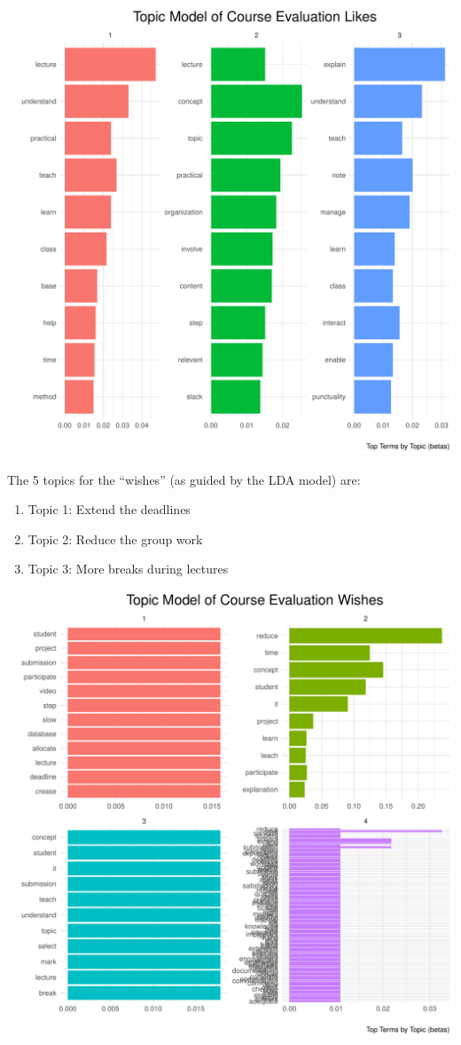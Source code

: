 \documentclass[
]{article}
\begin{document}
\includegraphics{Mid-SemesterCourseEvaluation-20240819-20241125-ADB-BBIT2.2_files/figure-latex/visualizations_for_likes_topic_modelling-1.pdf}

\newpage

The 5 topics for the ``wishes'' (as guided by the LDA model) are:

\begin{enumerate}
\def\labelenumi{\arabic{enumi}.}
\item
  Topic 1: Extend the deadlines
\item
  Topic 2: Reduce the group work
\item
  Topic 3: More breaks during lectures
\end{enumerate}

\includegraphics{Mid-SemesterCourseEvaluation-20240819-20241125-ADB-BBIT2.2_files/figure-latex/visualizations_for_wishes_topic_modelling-1.pdf}
\end{document}
